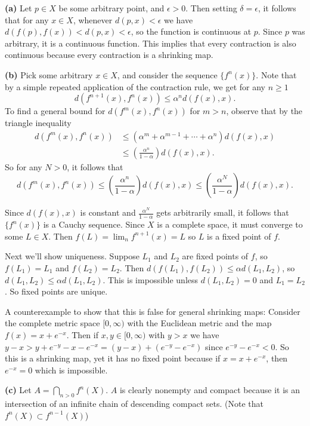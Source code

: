 \documentclass[11pt,letterpaper]{article}
\begin{document}
\begin{solution}
    \textbf{(a)} Let $p\in X$ be some arbitrary point, and $\epsilon > 0$. Then setting $\delta=\epsilon$, it follows that for any $x\in X$, whenever $d(p,x)<\epsilon$ we have $d(f(p),f(x))<d(p,x)<\epsilon$, so the function is continuous at $p$. Since $p$ was arbitrary, it is a continuous function. This implies that every contraction is also continuous because every contraction is a shrinking map.

    \textbf{(b)} Pick some arbitrary $x\in X$, and consider the sequence $\{f^n(x)\}$. Note that by a simple repeated application of the contraction rule, we get for any $n\geq 1$ 
    \[
        d(f^{n+1}(x), f^n(x)) \leq \alpha^n d(f(x), x)
    .\] 
    To find a general bound for $d(f^m(x), f^n(x))$ for $m > n$, observe that by the triangle inequality
    \[
        \begin{aligned}
            d(f^m(x), f^n(x)) &\leq (\alpha^m + \alpha^{m-1}+\cdots+\alpha^n)d(f(x), x)\\
            &\leq \left(\frac{\alpha^n}{1-\alpha}\right)d(f(x),x).
        \end{aligned}
    \]  
    So for any $N>0$, it follows that 
    \[
        d(f^m(x), f^n(x)) \leq \left(\frac{\alpha^n}{1-\alpha}\right)d(f(x),x)\leq \left(\frac{\alpha^N}{1-\alpha}\right)d(f(x),x).
    \]
    
    Since $d(f(x),x)$ is constant and $\frac{\alpha^N}{1-\alpha}$ gets arbitrarily small, it follows that $\{f^n(x)\}$ is a Cauchy sequence. Since $X$ is a complete space, it must converge to some $L\in X$. Then $f(L)=\lim_n f^{n+1}(x)=L$ so $L$ is a fixed point of $f$.
    
    Next we'll show uniqueness. Suppose $L_1$ and $L_2$ are fixed points of $f$, so $f(L_1)=L_1$ and $f(L_2)=L_2$. Then $d(f(L_1), f(L_2)) \leq \alpha d(L_1, L_2)$, so $d(L_1, L_2)\leq \alpha d(L_1, L_2)$. This is impossible unless $d(L_1,L_2)=0$ and $L_1=L_2$. So fixed points are unique. 
    
    A counterexample to show that this is false for general shrinking maps: Consider the complete metric space $[0,\infty)$ with the Euclidean metric and the map $f(x)=x+e^{-x}$. Then if $x,y\in [0,\infty)$ with $y>x$ we have $y-x > y+e^{-y}-x-e^{-x}=(y-x)+(e^{-y}-e^{-x})$ since $e^{-y}-e^{-x}<0$. So this is a shrinking map, yet it has no fixed point because if $x=x+e^{-x}$, then $e^{-x}=0$ which is impossible.       
    
    \textbf{(c)} Let $A=\bigcap_{n>0} f^n(X)$. $A$ is clearly nonempty and compact because it is an intersection of an infinite chain of descending compact sets. (Note that $f^n(X)\subset f^{n-1}(X)$)
    

\end{solution}
\end{document}
